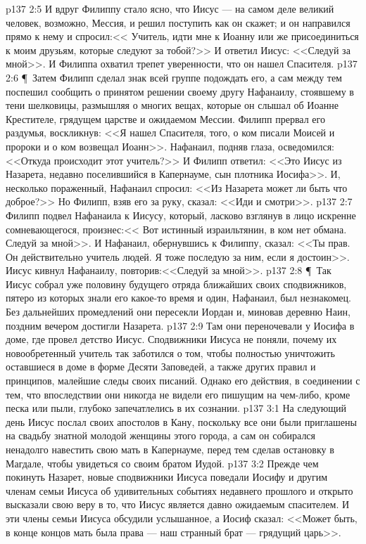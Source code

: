 \vs p137 2:5 И вдруг Филиппу стало ясно, что Иисус --- на самом деле великий человек, возможно, Мессия, и решил поступить как он скажет; и он направился прямо к нему и спросил:<< Учитель, идти мне к Иоанну или же присоединиться к моим друзьям, которые следуют за тобой?>> И ответил Иисус: <<Следуй за мной>>. И Филиппа охватил трепет уверенности, что он нашел Спасителя.
\vs p137 2:6 \P\ Затем Филипп сделал знак всей группе подождать его, а сам между тем поспешил сообщить о принятом решении своему другу Нафанаилу, стоявшему в тени шелковицы, размышляя о многих вещах, которые он слышал об Иоанне Крестителе, грядущем царстве и ожидаемом Мессии. Филипп прервал его раздумья, воскликнув: <<Я нашел Спасителя, того, о ком писали Моисей и пророки и о ком возвещал Иоанн>>. Нафанаил, подняв глаза, осведомился: <<Откуда происходит этот учитель?>> И Филипп ответил: <<Это Иисус из Назарета, недавно поселившийся в Капернауме, сын плотника Иосифа>>. И, несколько пораженный, Нафанаил спросил: <<Из Назарета может ли быть что доброе?>> Но Филипп, взяв его за руку, сказал: <<Иди и смотри>>.
\vs p137 2:7 Филипп подвел Нафанаила к Иисусу, который, ласково взглянув в лицо искренне сомневающегося, произнес:<< Вот истинный израильтянин, в ком нет обмана. Следуй за мной>>. И Нафанаил, обернувшись к Филиппу, сказал: <<Ты прав. Он действительно учитель людей. Я тоже последую за ним, если я достоин>>. Иисус кивнул Нафанаилу, повторив:<<Следуй за мной>>.
\vs p137 2:8 \P\ Так Иисус собрал уже половину будущего отряда ближайших своих сподвижников, пятеро из которых знали его какое\hyp{}то время и один, Нафанаил, был незнакомец. Без дальнейших промедлений они пересекли Иордан и, миновав деревню Наин, поздним вечером достигли Назарета.
\vs p137 2:9 Там они переночевали у Иосифа в доме, где провел детство Иисус. Сподвижники Иисуса не поняли, почему их новообретенный учитель так заботился о том, чтобы полностью уничтожить оставшиеся в доме в форме Десяти Заповедей, а также других правил и принципов, малейшие следы своих писаний. Однако его действия, в соединении с тем, что впоследствии они никогда не видели его пишущим на чем\hyp{}либо, кроме песка или пыли, глубоко запечатлелись в их сознании.
\vs p137 3:1 На следующий день Иисус послал своих апостолов в Кану, поскольку все они были приглашены на свадьбу знатной молодой женщины этого города, а сам он собирался ненадолго навестить свою мать в Капернауме, перед тем сделав остановку в Магдале, чтобы увидеться со своим братом Иудой.
\vs p137 3:2 Прежде чем покинуть Назарет, новые сподвижники Иисуса поведали Иосифу и другим членам семьи Иисуса об удивительных событиях недавнего прошлого и открыто высказали свою веру в то, что Иисус является давно ожидаемым спасителем. И эти члены семьи Иисуса обсудили услышанное, а Иосиф сказал: <<Может быть, в конце концов мать была права --- наш странный брат --- грядущий царь>>.
